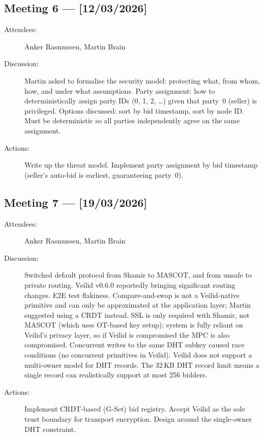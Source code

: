 \subsection*{Meeting 6 — [12/03/2026]}
\begin{description}
  \item[Attendees:] Anker Rasmussen, Martin Brain
  \item[Discussion:] Martin asked to formalise the security model: protecting
    what, from whom, how, and under what assumptions.  Party assignment:
    how to deterministically assign party IDs (0, 1, 2, \ldots) given that
    party~0 (seller) is privileged.  Options discussed: sort by bid
    timestamp, sort by node ID.  Must be deterministic so all parties
    independently agree on the same assignment.
  \item[Actions:] Write up the threat model.  Implement party assignment by
    bid timestamp (seller's auto-bid is earliest, guaranteeing party~0).
\end{description}
\subsection*{Meeting 7 — [19/03/2026]}
\begin{description}
  \item[Attendees:] Anker Rasmussen, Martin Brain
  \item[Discussion:] Switched default protocol from Shamir to MASCOT, and
    from unsafe to private routing.  Veilid v0.6.0 reportedly bringing
    significant routing changes.  E2E test flakiness.  Compare-and-swap is
    not a Veilid-native primitive and can only be approximated at the
    application layer; Martin suggested using a CRDT instead.  SSL is only
    required with Shamir, not MASCOT (which uses OT-based key setup);
    system is fully reliant on Veilid's privacy layer, so if Veilid is
    compromised the MPC is also compromised.  Concurrent writes to the same
    DHT subkey caused race conditions (no concurrent primitives in Veilid).
    Veilid does not support a multi-owner model for DHT records.  The 32\,KB
    DHT record limit means a single record can realistically support at most
    256 bidders.
  \item[Actions:] Implement CRDT-based (G-Set) bid registry.  Accept Veilid
    as the sole trust boundary for transport encryption.  Design around the
    single-owner DHT constraint.
\end{description}
